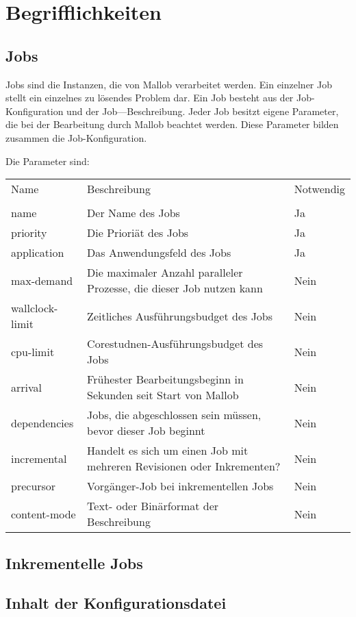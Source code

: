 \section{Begrifflichkeiten}
\label{B:Jobs}
\subsection{Jobs}

Jobs sind die Instanzen, die von Mallob verarbeitet werden. Ein einzelner Job stellt ein einzelnes zu lösendes Problem dar. Ein Job besteht aus der Job-Konfiguration und der Job—Beschreibung.
Jeder Job besitzt eigene Parameter, die bei der Bearbeitung durch Mallob beachtet werden. 
Diese Parameter bilden zusammen die Job-Konfiguration.

Die Parameter sind:
\begin{tabular}{lL{0.6\textwidth}l}
        Name & Beschreibung & Notwendig\\
        \\
        name & Der Name des Jobs & Ja\\
        priority & Die Prioriät des Jobs & Ja\\
        application & Das Anwendungsfeld des Jobs & Ja\\ 
        max-demand & Die maximaler Anzahl paralleler Prozesse, die dieser Job nutzen kann & Nein\\
        wallclock-limit & Zeitliches Ausführungsbudget des Jobs & Nein\\
        cpu-limit & Corestudnen-Ausführungsbudget des Jobs & Nein\\
        arrival & Frühester Bearbeitungsbeginn in Sekunden seit Start von Mallob & Nein\\
        dependencies & Jobs, die abgeschlossen sein müssen, bevor dieser Job beginnt & Nein\\
        incremental & Handelt es sich um einen Job mit mehreren Revisionen oder Inkrementen? &  Nein\\
        precursor & Vorgänger-Job bei inkrementellen Jobs & Nein\\
        content-mode & Text- oder Binärformat der Beschreibung & Nein\\
    \end{tabular} 



\subsection{Inkrementelle Jobs}

\subsection{Inhalt der Konfigurationsdatei}
